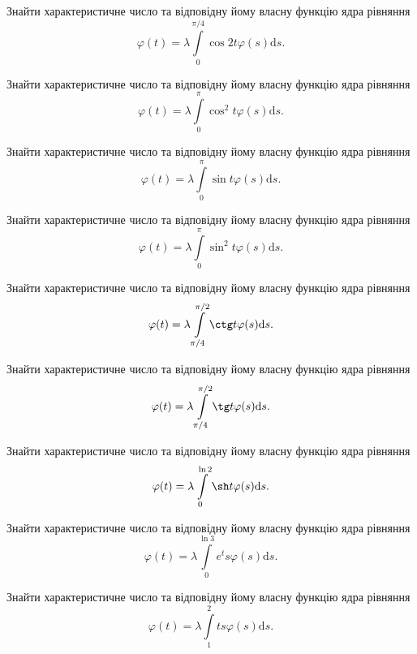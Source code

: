 \documentclass[12pt]{extarticle}
\begin{document}
\begin{Exercise}
Знайти характеристичне число та відповідну йому власну функцію ядра рівняння \[\varphi(t) = \lambda\int\limits_{0}^{\pi/4} \cos 2t \varphi(s) \mathrm{d}s.\]
\end{Exercise}

\begin{Exercise}
Знайти характеристичне число та відповідну йому власну функцію ядра рівняння \[\varphi(t) = \lambda\int\limits_{0}^{\pi} \cos^2 t \varphi(s) \mathrm{d}s.\]
\end{Exercise}

\begin{Exercise}
Знайти характеристичне число та відповідну йому власну функцію ядра рівняння \[\varphi(t) = \lambda\int\limits_{0}^{\pi} \sin t \varphi(s) \mathrm{d}s.\]
\end{Exercise}

\begin{Exercise}
Знайти характеристичне число та відповідну йому власну функцію ядра рівняння \[\varphi(t) = \lambda\int\limits_{0}^{\pi} \sin^2 t \varphi(s) \mathrm{d}s.\]
\end{Exercise}

\begin{Exercise}
Знайти характеристичне число та відповідну йому власну функцію ядра рівняння \[\varphi(t) = \lambda\int\limits_{\pi/4}^{\pi/2} \ctg t \varphi(s) \mathrm{d}s.\]
\end{Exercise}

\begin{Exercise}
Знайти характеристичне число та відповідну йому власну функцію ядра рівняння \[\varphi(t) = \lambda\int\limits_{\pi/4}^{\pi/2} \tg t \varphi(s) \mathrm{d}s.\]
\end{Exercise}

\begin{Exercise}
Знайти характеристичне число та відповідну йому власну функцію ядра рівняння \[\varphi(t) = \lambda\int\limits_{0}^{\ln 2} \sh t \varphi(s) \mathrm{d}s.\]
\end{Exercise}

\begin{Exercise}
Знайти характеристичне число та відповідну йому власну функцію ядра рівняння \[\varphi(t) = \lambda\int\limits_{0}^{\ln 3} e^t s \varphi(s) \mathrm{d}s.\]
\end{Exercise}

\begin{Exercise}
Знайти характеристичне число та відповідну йому власну функцію ядра рівняння \[\varphi(t) = \lambda\int\limits_{1}^{2} t s\varphi(s) \mathrm{d}s.\]
\end{Exercise}
\end{document}
